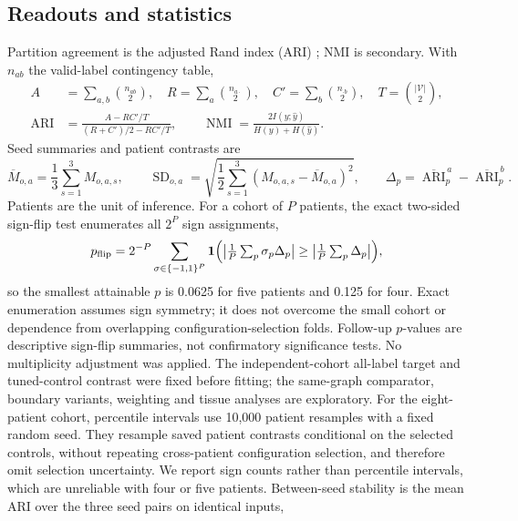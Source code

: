 \documentclass[11pt]{article}
\begin{document}
\subsection{Readouts and statistics}
Partition agreement is the adjusted Rand index (ARI) \citep{hubert1985ari}; NMI is secondary. With \(n_{ab}\) the valid-label contingency table,
\begin{align}
A&=\sum_{a,b}\binom{n_{ab}}{2},\quad R=\sum_a\binom{n_{a\cdot}}{2},\quad
C'=\sum_b\binom{n_{\cdot b}}{2},\quad T=\binom{|\mathcal V|}{2},\nonumber\\
\operatorname{ARI}&=\frac{A-RC'/T}{(R+C')/2-RC'/T},\qquad
\operatorname{NMI}=\frac{2I(y;\widehat y)}{H(y)+H(\widehat y)}.\label{eq:partition}
\end{align}
Seed summaries and patient contrasts are
\begin{equation}
\overline M_{o,a}=\frac13\sum_{s=1}^3 M_{o,a,s},\qquad
\operatorname{SD}_{o,a}=\sqrt{\frac12\sum_{s=1}^3(M_{o,a,s}-\overline M_{o,a})^2},\qquad
\Delta_p=\overline{\operatorname{ARI}}_p^{\,a}-\overline{\operatorname{ARI}}_p^{\,b}.\label{eq:seed-summary}
\end{equation}
Patients are the unit of inference. For a cohort of \(P\) patients, the exact two-sided sign-flip test enumerates all \(2^P\) sign assignments,
\begin{equation}
p_{\rm flip}=2^{-P}\sum_{\sigma\in\{-1,1\}^P}\mathbf1\Bigl(\bigl|\tfrac1P\textstyle\sum_p\sigma_p\Delta_p\bigr|\geq\bigl|\tfrac1P\sum_p\Delta_p\bigr|\Bigr),\label{eq:patient}
\end{equation}
so the smallest attainable \(p\) is 0.0625 for five patients and 0.125 for four. Exact enumeration assumes sign symmetry; it does not overcome the small cohort or dependence from overlapping configuration-selection folds. Follow-up \(p\)-values are descriptive sign-flip summaries, not confirmatory significance tests. No multiplicity adjustment was applied. The independent-cohort all-label target and tuned-control contrast were fixed before fitting; the same-graph comparator, boundary variants, weighting and tissue analyses are exploratory. For the eight-patient cohort, percentile intervals use 10,000 patient resamples with a fixed random seed. They resample saved patient contrasts conditional on the selected controls, without repeating cross-patient configuration selection, and therefore omit selection uncertainty. We report sign counts rather than percentile intervals, which are unreliable with four or five patients. Between-seed stability is the mean ARI over the three seed pairs on identical inputs,
\end{document}
